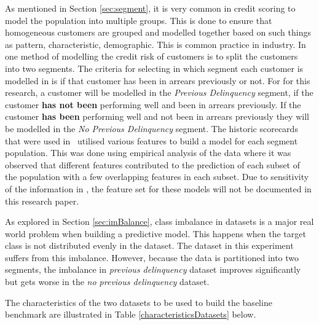 As mentioned in Section \ref{sec:segment}, it is very common in credit scoring to model the population into multiple groups. This is done to ensure that homogeneous customers are grouped and modelled together based on such things as pattern, characteristic, demographic. This is common practice in industry. In \subjectname\, one method of modelling the credit risk of customers is to split the customers into two segments. The criteria for selecting in which segment each customer is modelled in is if that customer has been in arrears previously or not. For for this research, a customer will be modelled in the \textit{Previous Delinquency} segment, if the customer \textbf{has not been} performing well and been in arrears previously. If the customer \textbf{has been} performing well and not been in arrears previously they will be modelled in the \textit{No Previous Delinquency} segment. The historic scorecards that were used in \subjectname\ utilised various features to build a model for each segment population. This was done using empirical analysis of the data where it was observed that different features contributed to the prediction of each subset of the population with a few overlapping features in each subset. Due to sensitivity of the information in \subjectname, the feature set for these models will not be documented in this research paper.

As explored in Section \ref{sec:imBalance}, class imbalance in datasets is a major real world problem when building a predictive model. This happens when the target class is not distributed evenly in the dataset. The dataset in this experiment suffers from this imbalance. However, because the data is partitioned into two segments, the imbalance in \textit{previous delinquency} dataset improves significantly but gets worse in the \textit{no previous delinquency} dataset.

The characteristics of the two datasets to be used to build the baseline benchmark are illustrated in Table \ref{characteristicsDatasets} below.

